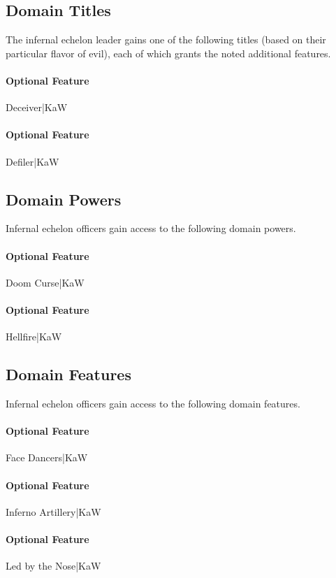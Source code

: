 \documentclass[10pt,a4paper,twoside,bg=print,twocolumn,openany,nodeprecatedcode]{dndbook}
\begin{document}
\subsection{Domain Titles}
The infernal echelon leader gains one of the following titles (based on their particular flavor of evil), each of which grants the noted additional features.

\paragraph{Optional Feature}
Deceiver|KaW

\paragraph{Optional Feature}
Defiler|KaW

\subsection{Domain Powers}
Infernal echelon officers gain access to the following domain powers.

\paragraph{Optional Feature}
Doom Curse|KaW

\paragraph{Optional Feature}
Hellfire|KaW

\subsection{Domain Features}
Infernal echelon officers gain access to the following domain features.

\paragraph{Optional Feature}
Face Dancers|KaW

\paragraph{Optional Feature}
Inferno Artillery|KaW

\paragraph{Optional Feature}
Led by the Nose|KaW
\end{document}
